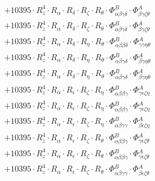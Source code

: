 \documentclass{article}
\begin{document}
\begin{subequations}
\begin{gather}
\begin{array}{c}
 \\[0.2em] 		 + 10395 \cdot R_{z}^{4} \cdot R_{\alpha{}} \cdot R_{\delta{}} \cdot R_{\zeta{}} \cdot R_{\theta{}} \cdot \Phi{}^{B}_{\alpha{}\beta{}\gamma{}\delta{}} \cdot \Phi{}^{A}_{\beta{}\gamma{}\zeta{}\theta{}} 
 \\[0.2em] 		 + 10395 \cdot R_{z}^{4} \cdot R_{\alpha{}} \cdot R_{\delta{}} \cdot R_{\zeta{}} \cdot R_{\theta{}} \cdot \Phi{}^{B}_{\alpha{}\beta{}\gamma{}\delta{}} \cdot \Phi{}^{A}_{\beta{}\gamma{}\zeta{}\theta{}} 
 \\[0.2em] 		 + 10395 \cdot R_{z}^{4} \cdot R_{\alpha{}} \cdot R_{\delta{}} \cdot R_{\eta{}} \cdot R_{\theta{}} \cdot \Phi{}^{B}_{\alpha{}\beta{}\beta{}\delta{}} \cdot \Phi{}^{A}_{\gamma{}\gamma{}\eta{}\theta{}} 
 \\[0.2em] 		 + 10395 \cdot R_{z}^{4} \cdot R_{\alpha{}} \cdot R_{\delta{}} \cdot R_{\eta{}} \cdot R_{\theta{}} \cdot \Phi{}^{B}_{\alpha{}\beta{}\gamma{}\delta{}} \cdot \Phi{}^{A}_{\beta{}\gamma{}\eta{}\theta{}} 
 \\[0.2em] 		 + 10395 \cdot R_{z}^{4} \cdot R_{\alpha{}} \cdot R_{\delta{}} \cdot R_{\eta{}} \cdot R_{\theta{}} \cdot \Phi{}^{B}_{\alpha{}\beta{}\gamma{}\delta{}} \cdot \Phi{}^{A}_{\beta{}\gamma{}\eta{}\theta{}} 
 \\[0.2em] 		 + 10395 \cdot R_{z}^{4} \cdot R_{\alpha{}} \cdot R_{\epsilon{}} \cdot R_{\zeta{}} \cdot R_{\eta{}} \cdot \Phi{}^{B}_{\alpha{}\beta{}\beta{}\gamma{}} \cdot \Phi{}^{A}_{\gamma{}\epsilon{}\zeta{}\eta{}} 
 \\[0.2em] 		 + 10395 \cdot R_{z}^{4} \cdot R_{\alpha{}} \cdot R_{\epsilon{}} \cdot R_{\zeta{}} \cdot R_{\eta{}} \cdot \Phi{}^{B}_{\alpha{}\beta{}\beta{}\gamma{}} \cdot \Phi{}^{A}_{\gamma{}\epsilon{}\zeta{}\eta{}} 
 \\[0.2em] 		 + 10395 \cdot R_{z}^{4} \cdot R_{\alpha{}} \cdot R_{\epsilon{}} \cdot R_{\zeta{}} \cdot R_{\eta{}} \cdot \Phi{}^{B}_{\alpha{}\beta{}\gamma{}\gamma{}} \cdot \Phi{}^{A}_{\beta{}\epsilon{}\zeta{}\eta{}} 
 \\[0.2em] 		 + 10395 \cdot R_{z}^{4} \cdot R_{\alpha{}} \cdot R_{\epsilon{}} \cdot R_{\zeta{}} \cdot R_{\theta{}} \cdot \Phi{}^{B}_{\alpha{}\beta{}\beta{}\gamma{}} \cdot \Phi{}^{A}_{\gamma{}\epsilon{}\zeta{}\theta{}} 
 \\[0.2em] 		 + 10395 \cdot R_{z}^{4} \cdot R_{\alpha{}} \cdot R_{\epsilon{}} \cdot R_{\zeta{}} \cdot R_{\theta{}} \cdot \Phi{}^{B}_{\alpha{}\beta{}\beta{}\gamma{}} \cdot \Phi{}^{A}_{\gamma{}\epsilon{}\zeta{}\theta{}} 
 \\[0.2em] 		 + 10395 \cdot R_{z}^{4} \cdot R_{\alpha{}} \cdot R_{\epsilon{}} \cdot R_{\zeta{}} \cdot R_{\theta{}} \cdot \Phi{}^{B}_{\alpha{}\beta{}\gamma{}\gamma{}} \cdot \Phi{}^{A}_{\beta{}\epsilon{}\zeta{}\theta{}} 

\end{array}
\end{gather}
\end{subequations}
\end{document}

